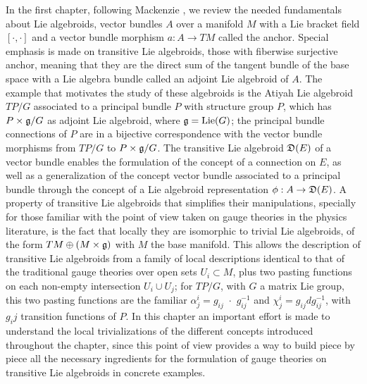 In the first chapter, following Mackenzie \cite{Mackenzie2005}, we review the needed fundamentals about Lie algebroids, vector bundles $A$ over a manifold $M$ with a Lie bracket field $[\cdot, \cdot ]$ and a vector bundle morphism $a:A \to TM$ called the anchor. Special emphasis is made on transitive Lie algebroids, those with fiberwise surjective anchor, meaning that they are the direct sum of the tangent bundle of the base space with a Lie algebra bundle called an adjoint Lie algebroid of $A$. The example that motivates the study of these algebroids is the Atiyah Lie algebroid $TP/G$ associated to a principal bundle $P$ with structure group $P$, which has $P \times \mathfrak{g}/G$ as adjoint Lie algebroid, where $\mathfrak{g} = \text{Lie}(G)$; the principal bundle connections of $P$ are in a bijective correspondence with the vector bundle morphisms from $TP/G$ to $P \times \mathfrak{g}/G$. The transitive Lie algebroid $\mathfrak{D}(E)$ of a vector bundle enables the formulation of the concept of a connection on $E$, as well as a generalization of the concept vector bundle associated to a principal bundle through the concept of a Lie algebroid representation $\phi: A \to \alg D(E)$. A property of transitive Lie algebroids that simplifies their manipulations, specially for those familiar with the point of view taken on gauge theories in the physics literature, is the fact that locally they are isomorphic to trivial Lie algebroids, of the form $TM \oplus (M \times \mathfrak{g})$ with $M$ the base manifold. This allows the description of transitive Lie algebroids from a family of local descriptions identical to that of the traditional gauge theories over open sets $U_i \subset M$, plus two pasting functions on each non-empty intersection $U_i \cup U_j$; for $TP/G$, with $G$ a matrix Lie group, this two pasting functions are the familiar $\alpha^i_j = g_{ij} \,\,\cdot \,\, g_{ij}^{-1}$ and $\chi^i_j = g_{ij} dg_{ij}^{-1}$, with $g_ij$ transition functions of $P$. In this chapter an important effort is made to understand the local trivializations of the different concepts introduced throughout the chapter, since this point of view provides a way to build piece by piece all the necessary ingredients for the formulation of gauge theories on transitive Lie algebroids in concrete examples.

